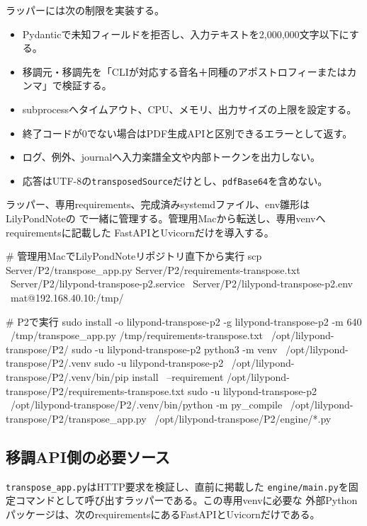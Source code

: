 \documentclass[uplatex,a4paper,11pt]{jsarticle}
\begin{document}
ラッパーには次の制限を実装する。

\begin{itemize}
  \item Pydanticで未知フィールドを拒否し、入力テキストを2,000,000文字以下にする。
  \item 移調元・移調先を「CLIが対応する音名＋同種のアポストロフィーまたはカンマ」で検証する。
  \item subprocessへタイムアウト、CPU、メモリ、出力サイズの上限を設定する。
  \item 終了コードが0でない場合はPDF生成APIと区別できるエラーとして返す。
  \item ログ、例外、journalへ入力楽譜全文や内部トークンを出力しない。
  \item 応答はUTF-8の\texttt{transposedSource}だけとし、\texttt{pdfBase64}を含めない。
\end{itemize}

ラッパー、専用requirements、完成済みsystemdファイル、env雛形はLilyPondNoteの
で一緒に管理する。管理用Macから転送し、専用venvへrequirementsに記載した
FastAPIとUvicornだけを導入する。

\begin{command}
# 管理用MacでLilyPondNoteリポジトリ直下から実行
scp Server/P2/transpose_app.py Server/P2/requirements-transpose.txt \
  Server/P2/lilypond-transpose-p2.service \
  Server/P2/lilypond-transpose-p2.env \
  mat@192.168.40.10:/tmp/

# P2で実行
sudo install -o lilypond-transpose-p2 -g lilypond-transpose-p2 -m 640 \
  /tmp/transpose_app.py /tmp/requirements-transpose.txt \
  /opt/lilypond-transpose/P2/
sudo -u lilypond-transpose-p2 python3 -m venv \
  /opt/lilypond-transpose/P2/.venv
sudo -u lilypond-transpose-p2 \
  /opt/lilypond-transpose/P2/.venv/bin/pip install \
  --requirement /opt/lilypond-transpose/P2/requirements-transpose.txt
sudo -u lilypond-transpose-p2 \
  /opt/lilypond-transpose/P2/.venv/bin/python -m py_compile \
  /opt/lilypond-transpose/P2/transpose_app.py \
  /opt/lilypond-transpose/P2/engine/*.py
\end{command}

\subsection{移調API側の必要ソース}

\texttt{transpose\_app.py}はHTTP要求を検証し、直前に掲載した
\texttt{engine/main.py}を固定コマンドとして呼び出すラッパーである。この専用venvに必要な
外部Pythonパッケージは、次のrequirementsにあるFastAPIとUvicornだけである。
\end{document}
